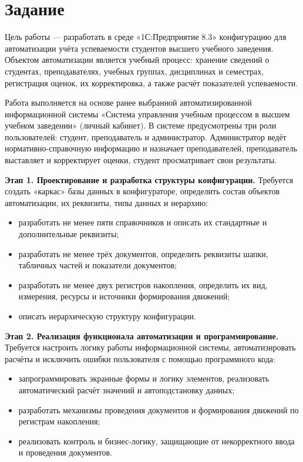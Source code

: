 \documentclass[14pt,a4paper]{extarticle}
\begin{document}
\section{Задание}

Цель работы --- разработать в среде «1С:Предприятие 8.3» конфигурацию для
автоматизации учёта успеваемости студентов высшего учебного заведения.
Объектом автоматизации является учебный процесс: хранение сведений о студентах,
преподавателях, учебных группах, дисциплинах и семестрах, регистрация оценок,
их корректировка, а также расчёт показателей успеваемости.

Работа выполняется на основе ранее выбранной автоматизированной информационной
системы «Система управления учебным процессом в высшем учебном заведении»
(личный кабинет). В системе предусмотрены три роли пользователей: студент,
преподаватель и администратор. Администратор ведёт нормативно-справочную
информацию и назначает преподавателей, преподаватель выставляет и корректирует
оценки, студент просматривает свои результаты.

\textbf{Этап 1. Проектирование и разработка структуры конфигурации.}
Требуется создать «каркас» базы данных в конфигураторе, определить состав
объектов автоматизации, их реквизиты, типы данных и иерархию:

\begin{itemize}
    \item разработать не менее пяти справочников и описать их стандартные и
    дополнительные реквизиты;
    \item разработать не менее трёх документов, определить реквизиты шапки,
    табличных частей и показатели документов;
    \item разработать не менее двух регистров накопления, определить их вид,
    измерения, ресурсы и источники формирования движений;
    \item описать иерархическую структуру конфигурации.
\end{itemize}

\textbf{Этап 2. Реализация функционала автоматизации и программирование.}
Требуется настроить логику работы информационной системы, автоматизировать
расчёты и исключить ошибки пользователя с помощью программного кода:

\begin{itemize}
    \item запрограммировать экранные формы и логику элементов, реализовать
    автоматический расчёт значений и автоподстановку данных;
    \item разработать механизмы проведения документов и формирования движений
    по регистрам накопления;
    \item реализовать контроль и бизнес-логику, защищающие от некорректного
    ввода и проведения документов.
\end{itemize}
\end{document}
